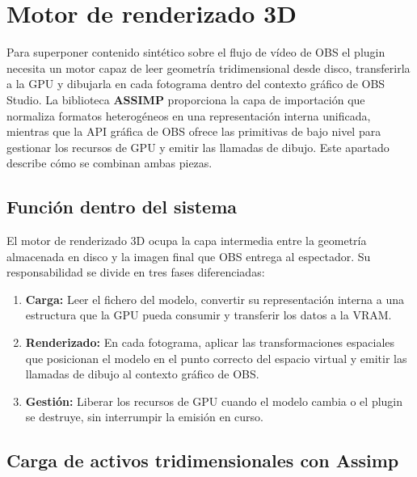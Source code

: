 \section{Motor de renderizado 3D}
\label{sec:motor_3d}

Para superponer contenido sintético sobre el flujo de vídeo de OBS el plugin necesita un motor capaz de leer geometría tridimensional desde disco, transferirla a la GPU y dibujarla en cada fotograma dentro del contexto gráfico de OBS Studio. La biblioteca \textbf{ASSIMP} \citep{assimp_github} proporciona la capa de importación que normaliza formatos heterogéneos en una representación interna unificada, mientras que la API gráfica de OBS \citep{obs_graphics_api} ofrece las primitivas de bajo nivel para gestionar los recursos de GPU y emitir las llamadas de dibujo. Este apartado describe cómo se combinan ambas piezas.

\subsection{Función dentro del sistema}
\label{subsec:funcion_motor}

El motor de renderizado 3D ocupa la capa intermedia entre la geometría almacenada en disco y la imagen final que OBS entrega al espectador. Su responsabilidad se divide en tres fases diferenciadas:

\begin{enumerate}
    \item \textbf{Carga:} Leer el fichero del modelo, convertir su representación interna a una estructura que la GPU pueda consumir y transferir los datos a la VRAM.
    \item \textbf{Renderizado:} En cada fotograma, aplicar las transformaciones espaciales que posicionan el modelo en el punto correcto del espacio virtual y emitir las llamadas de dibujo al contexto gráfico de OBS.
    \item \textbf{Gestión:} Liberar los recursos de GPU cuando el modelo cambia o el plugin se destruye, sin interrumpir la emisión en curso.
\end{enumerate}

\subsection{Carga de activos tridimensionales con Assimp}
\label{subsec:modelos_3d}

